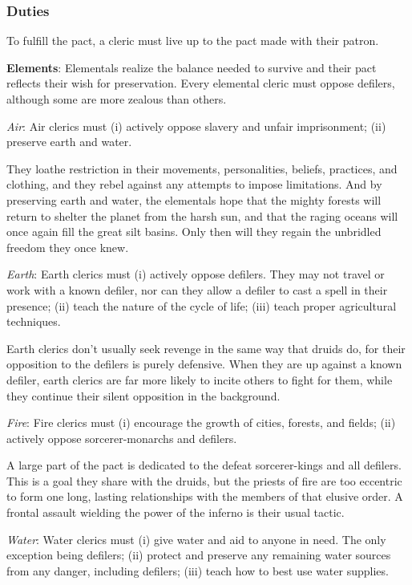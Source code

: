 \subsubsection{Duties}
To fulfill the pact, a cleric must live up to the pact made with their patron.

\textbf{Elements}: Elementals realize the balance needed to survive and their pact reflects their wish for preservation. Every elemental cleric must oppose defilers, although some are more zealous than others.

\textit{Air}: Air clerics must
	(i) actively oppose slavery and unfair imprisonment;
	(ii) preserve earth and water.

They loathe restriction in their movements, personalities, beliefs, practices, and clothing, and they rebel against any attempts to impose limitations. And by preserving earth and water, the elementals hope that the mighty forests will return to shelter the planet from the harsh sun, and that the raging oceans will once again fill the great silt basins. Only then will they regain the unbridled freedom they once knew.

\textit{Earth}: Earth clerics must
	(i) actively oppose defilers. They may not travel or work with a known defiler, nor can they allow a defiler to cast a spell in their presence;
	(ii) teach the nature of the cycle of life;
	(iii) teach proper agricultural techniques.

Earth clerics don't usually seek revenge in the same way that druids do, for their opposition to the defilers is purely defensive. When they are up against a known defiler, earth clerics are far more likely to incite others to fight for them, while they continue their silent opposition in the background.

\textit{Fire}: Fire clerics must
	(i) encourage the growth of cities, forests, and fields;
	(ii) actively oppose sorcerer-monarchs and defilers.

A large part of the pact is dedicated to the defeat sorcerer-kings and all defilers. This is a goal they share with the druids, but the priests of fire are too eccentric to form one long, lasting relationships with the members of that elusive order. A frontal assault wielding the power of the inferno is their usual tactic.

\textit{Water}: Water clerics must
	(i) give water and aid to anyone in need. The only exception being defilers;
	(ii) protect and preserve any remaining water sources from any danger, including defilers;
	(iii) teach how to best use water supplies.

